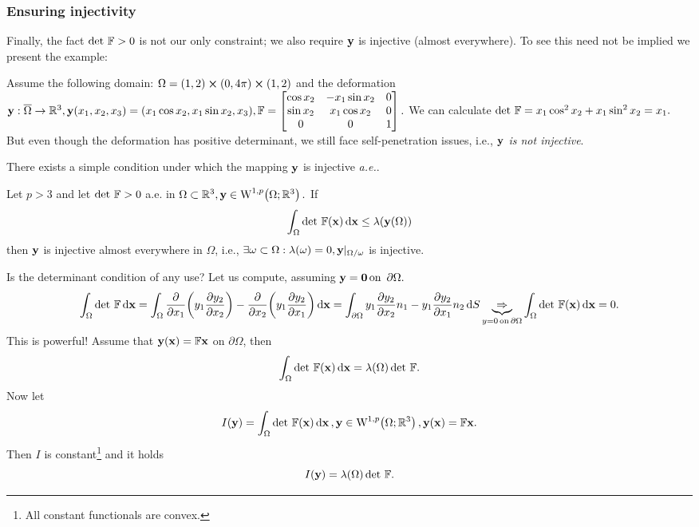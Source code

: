\documentclass[11pt]{scrartcl} %
\begin{document}
\subsubsection{Ensuring injectivity}
\label{sec:ensuring_injectivity}
Finally, the fact $\det\, \mathbb{F}>0$ is not our only constraint; we also require $\vb{y}$ is injective (almost everywhere). To see this need not be implied we present the example:
\begin{example}
	Assume the following domain: $\Omega = (1,2) \cross (0,4 \pi) \cross (1,2)$ and the deformation $\vb{y}: \overline{\Omega} \to {\mathbb R}^3, \vb{y}\qty(x_1,x_2,x_3) = \qty(x_1 \cos x_2, x_1 \sin x_2, x_3), \mathbb{F}  = \begin{bmatrix}
		\cos x_2 & -x_1 \sin x_2 & 0\\
		\sin x_2 & x_1 \cos x_2 & 0\\
		0 & 0 & 1
	\end{bmatrix}.$
	We can calculate $\det\, \mathbb{F} = x_1 \cos^{2}x_2 + x_1 \sin^{2}x_2 = x_1.$ But even though the deformation has positive determinant, we still face self-penetration issues, i.e., \textit{$\vb{y}$ is not injective}.
\end{example}
There exists a simple condition under which the mapping $\vb{y}$ is injective \textit{a.e.}.
	\begin{theorem}
    Let $p>3$ and let $\det\, \mathbb{F} > 0$ a.e. in $\Omega \subset \R^3, \vb{y} \in \WkpSet[1][p]{\Omega; \R^3}.$ If
    \[
	    \int_{\Omega}\det\, \mathbb{F}\qty(\vb{x})\dd{\vb{x}} \leq \lambda\qty(\vb{y}\qty(\Omega))
    \]
    then $\vb{y}$ is injective almost everywhere in $\Omega$, i.e., $\exists \omega \subset \Omega: \lambda\qty(\omega) = 0, \vb{y}|_{\Omega / \omega}$ is injective.
\end{theorem}

Is the determinant condition of any use? Let us compute, assuming $\vb{y}= \vb{0} \, \text{on } \, \partial \Omega.$
\[
	\int_{\Omega}\det\, \mathbb{F}\dd{\vb{x}} = \int_{\Omega}\pdv{x_1}\qty(y_1 \pdv{y_2}{x_{2}})-\pdv{x_2}\qty(y_1 \pdv{y_2}{x_1})\dd{\vb{x}} = \int_{\partial \Omega}y_1 \pdv{y_2}{x_2}n_1 - y_1 \pdv{y_2}{x_1} n_2\dd{S} \underbrace{\Rightarrow}_{y=0 \, \text{on} \, \partial \Omega} \int_{\Omega}\det\, \mathbb{F}\qty(\vb{x})\dd{\vb{x}} = 0.
\]
This is powerful! Assume that $\vb{y}\qty(\vb{x}) = \mathbb{F} \vb{x}$ on $\partial \Omega$, then
\[
	\int_{\Omega}\det\, \mathbb{F}\qty(\vb{x})\dd{\vb{x}} = \lambda\qty(\Omega)\det\, \mathbb{F}.
\]
Now let
\[
	I\qty(\vb{y}) = \int_{\Omega}\detf\qty(\vb{x})\dd{\vb{x}}, \vb{y}\in \WkpSet[1][p]{\Omega; \R^3}, \vb{y}\qty(\vb{x}) = \fgrad \vb{x}.
\]
Then $I$ is constant\footnote{All constant functionals are convex.} and it holds
\[
	I\qty(\vb{y}) = \lambda\qty(\Omega)\det\, \mathbb{F}.
\]
\end{document}
